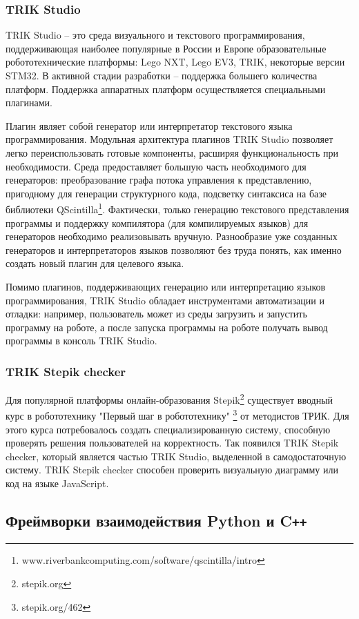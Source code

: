 \documentclass[14pt]{matmex-diploma-custom}
\begin{document}
\subsubsection{TRIK Studio}
TRIK Studio -- это среда визуального и текстового программирования, поддерживающая наиболее популярные в России и Европе образовательные робототехнические платформы: Lego NXT, Lego EV3, TRIK, некоторые версии STM32. В активной стадии разработки -- поддержка большего количества платформ. Поддержка аппаратных платформ осуществляется специальными плагинами. 

Плагин являет собой генератор или интерпретатор текстового языка программирования. Модульная архитектура плагинов TRIK Studio позволяет легко переиспользовать готовые компоненты, расширяя функциональность при необходимости. Среда предоставляет большую часть необходимого для генераторов: преобразование графа потока управления к представлению, пригодному для генерации структурного кода, подсветку синтаксиса на базе библиотеки QScintilla\footnote{www.riverbankcomputing.com/software/qscintilla/intro}. Фактически, только генерацию текстового представления программы и поддержку компилятора (для компилируемых языков) для генераторов необходимо реализовывать вручную. Разнообразие уже созданных генераторов и интерпретаторов языков позволяют без труда понять, как именно создать новый плагин для целевого языка.

Помимо плагинов, поддерживающих генерацию или интерпретацию языков программирования, TRIK Studio обладает инструментами автоматизации и отладки: например, пользователь может из среды загрузить и запустить программу на роботе, а после запуска программы на роботе получать вывод программы в консоль TRIK Studio.

\subsubsection{TRIK Stepik checker}
Для популярной платформы онлайн-образования Stepik\footnote{stepik.org} существует вводный курс в робототехнику "Первый шаг в робототехнику" \footnote{stepik.org/462} от методистов ТРИК. Для этого курса потребовалось создать специализированную систему, способную проверять решения пользователей на корректность. Так появился TRIK Stepik checker, который является частью TRIK Studio, выделенной в самодостаточную систему. TRIK Stepik checker способен проверить визуальную диаграмму или код на языке JavaScript.

\subsection{Фреймворки взаимодействия Python и C\texttt{++}}
\end{document}
